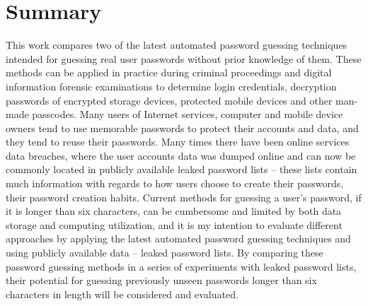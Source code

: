 \documentclass{VUMIFInfBakalaurinis}
\begin{document}
\section{Summary}
This work compares two of the latest automated password guessing techniques 
intended for guessing real user passwords without prior knowledge of them. These 
methods can be applied in practice during criminal proceedings and digital 
information forensic examinations to determine login credentials, decryption 
passwords of encrypted storage devices, protected mobile devices and other 
man-made passcodes. Many users of Internet services, computer and mobile device 
owners tend to use memorable passwords to protect their accounts and data, and 
they tend to reuse their passwords. Many times there have been online services 
data breaches, where the user accounts data was dumped online and can now be 
commonly located in publicly available leaked password lists -- these lists 
contain much information with regards to how users choose to create their 
passwords, their password creation habits. Current methods for guessing a user's 
password, if it is longer than six characters, can be cumbersome and limited
by both data storage and computing utilization, and it is my intention to 
evaluate different approaches by applying the latest automated password guessing 
techniques and using publicly available data -- leaked password lists. By 
comparing these password guessing methods in a series of experiments with leaked 
password lists, their potential for guessing previously unseen passwords longer 
than six characters in length will be considered and evaluated.
\end{document}
